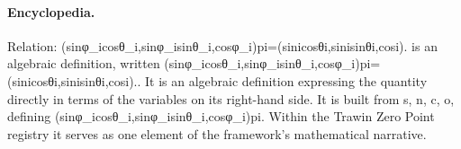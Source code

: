 \paragraph{Encyclopedia.}
Relation: (sinφ\_icosθ\_i,sinφ\_isinθ\_i,cosφ\_i)pi=(sinicosθi,sinisinθi,cosi). is an algebraic definition, written (sinφ\_icosθ\_i,sinφ\_isinθ\_i,cosφ\_i)pi=(sinicosθi,sinisinθi,cosi).. It is an algebraic definition expressing the quantity directly in terms of the variables on its right-hand side. It is built from s, n, c, o, defining (sinφ\_icosθ\_i,sinφ\_isinθ\_i,cosφ\_i)pi. Within the Trawin Zero Point registry it serves as one element of the framework's mathematical narrative.
